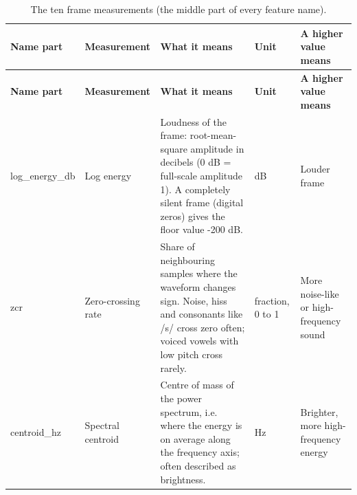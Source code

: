 \documentclass[11pt,a4paper]{article}
\begin{document}
\begin{center}\small\renewcommand{\arraystretch}{1.15}
\begin{longtable}{>{\raggedright\arraybackslash}p{2.14cm}>{\raggedright\arraybackslash}p{2.23cm}>{\raggedright\arraybackslash}p{5.95cm}>{\raggedright\arraybackslash}p{1.67cm}>{\raggedright\arraybackslash}p{2.42cm}}
\caption{The ten frame measurements (the middle part of every feature name).}\\
\toprule
\textbf{\hspace{0pt}Name part} & \textbf{\hspace{0pt}Measurement} & \textbf{\hspace{0pt}What it means} & \textbf{\hspace{0pt}Unit} & \textbf{\hspace{0pt}A higher value means}\\\midrule\endfirsthead
\toprule
\textbf{\hspace{0pt}Name part} & \textbf{\hspace{0pt}Measurement} & \textbf{\hspace{0pt}What it means} & \textbf{\hspace{0pt}Unit} & \textbf{\hspace{0pt}A higher value means}\\\midrule\endhead
\bottomrule\endfoot
\hspace{0pt}log\_\allowbreak{}energy\_\allowbreak{}db & \hspace{0pt}Log energy & \hspace{0pt}Loudness of the frame: root-mean-square amplitude in decibels (0 dB = full-scale amplitude 1). A completely silent frame (digital zeros) gives the floor value -200 dB. & \hspace{0pt}dB & \hspace{0pt}Louder frame\\
\hspace{0pt}zcr & \hspace{0pt}Zero-crossing rate & \hspace{0pt}Share of neighbouring samples where the waveform changes sign. Noise, hiss and consonants like /\allowbreak{}s/\allowbreak{} cross zero often; voiced vowels with low pitch cross rarely. & \hspace{0pt}fraction, 0 to 1 & \hspace{0pt}More noise-like or high-frequency sound\\
\hspace{0pt}centroid\_\allowbreak{}hz & \hspace{0pt}Spectral centroid & \hspace{0pt}Centre of mass of the power spectrum, i.e. where the energy is on average along the frequency axis; often described as brightness. & \hspace{0pt}Hz & \hspace{0pt}Brighter, more high-frequency energy\\

\end{longtable}
\end{center}
\end{document}
